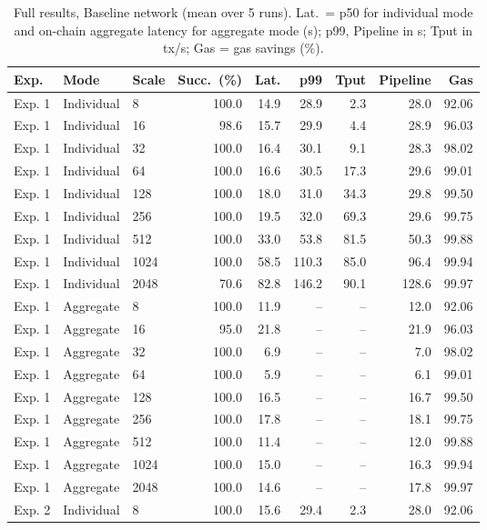 \begin{table}[!t]
\centering
\scriptsize
\caption{Full results, Baseline network (mean over 5 runs). Lat.\ = p50 for individual mode and on-chain aggregate latency for aggregate mode (s); p99, Pipeline in s; Tput in tx/s; Gas = gas savings (\%).}
\label{tab:full-baseline}
\begin{tabular}{@{}lllrrrrrr@{}}
\toprule
Exp. & Mode & Scale & Succ.\ (\%) & Lat. & p99 & Tput & Pipeline & Gas \\
\midrule
Exp. 1 & Individual & 8 & 100.0 & 14.9 & 28.9 & 2.3 & 28.0 & 92.06 \\
Exp. 1 & Individual & 16 & 98.6 & 15.7 & 29.9 & 4.4 & 28.9 & 96.03 \\
Exp. 1 & Individual & 32 & 100.0 & 16.4 & 30.1 & 9.1 & 28.3 & 98.02 \\
Exp. 1 & Individual & 64 & 100.0 & 16.6 & 30.5 & 17.3 & 29.6 & 99.01 \\
Exp. 1 & Individual & 128 & 100.0 & 18.0 & 31.0 & 34.3 & 29.8 & 99.50 \\
Exp. 1 & Individual & 256 & 100.0 & 19.5 & 32.0 & 69.3 & 29.6 & 99.75 \\
Exp. 1 & Individual & 512 & 100.0 & 33.0 & 53.8 & 81.5 & 50.3 & 99.88 \\
Exp. 1 & Individual & 1024 & 100.0 & 58.5 & 110.3 & 85.0 & 96.4 & 99.94 \\
Exp. 1 & Individual & 2048 & 70.6 & 82.8 & 146.2 & 90.1 & 128.6 & 99.97 \\
\addlinespace[2pt]
Exp. 1 & Aggregate & 8 & 100.0 & 11.9 & -- & -- & 12.0 & 92.06 \\
Exp. 1 & Aggregate & 16 & 95.0 & 21.8 & -- & -- & 21.9 & 96.03 \\
Exp. 1 & Aggregate & 32 & 100.0 & 6.9 & -- & -- & 7.0 & 98.02 \\
Exp. 1 & Aggregate & 64 & 100.0 & 5.9 & -- & -- & 6.1 & 99.01 \\
Exp. 1 & Aggregate & 128 & 100.0 & 16.5 & -- & -- & 16.7 & 99.50 \\
Exp. 1 & Aggregate & 256 & 100.0 & 17.8 & -- & -- & 18.1 & 99.75 \\
Exp. 1 & Aggregate & 512 & 100.0 & 11.4 & -- & -- & 12.0 & 99.88 \\
Exp. 1 & Aggregate & 1024 & 100.0 & 15.0 & -- & -- & 16.3 & 99.94 \\
Exp. 1 & Aggregate & 2048 & 100.0 & 14.6 & -- & -- & 17.8 & 99.97 \\
\addlinespace[2pt]
Exp. 2 & Individual & 8 & 100.0 & 15.6 & 29.4 & 2.3 & 28.0 & 92.06 \\

\end{tabular}
\end{table}
